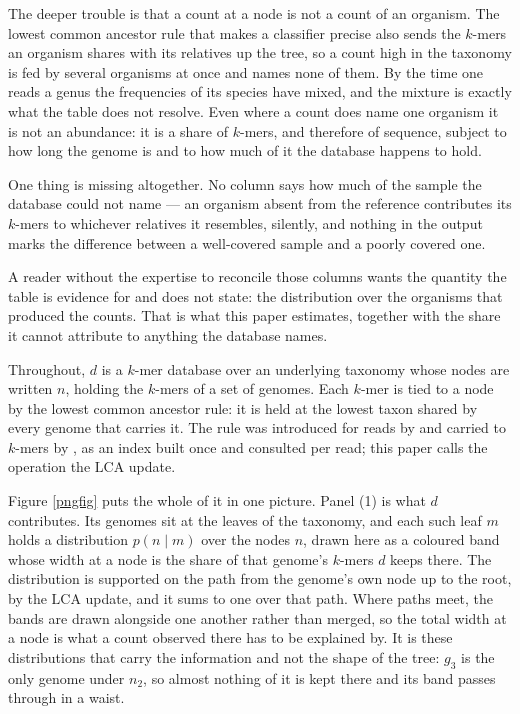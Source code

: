 \documentclass[pdflatex,sn-vancouver-num]{sn-jnl}
\begin{document}
    The deeper trouble is that a count at a node is not a count of an organism. The lowest common
    ancestor rule that makes a classifier precise also sends the $k$-mers an organism shares with its
    relatives up the tree, so a count high in the taxonomy is fed by several organisms at once and
    names none of them. By the time one reads a genus the frequencies of its species have mixed, and
    the mixture is exactly what the table does not resolve. Even where a count does name one organism
    it is not an abundance: it is a share of $k$-mers, and therefore of sequence, subject to how long
    the genome is and to how much of it the database happens to hold.

    One thing is missing altogether. No column says how much of the sample the database could not
    name --- an organism absent from the reference contributes its $k$-mers to whichever relatives it
    resembles, silently, and nothing in the output marks the difference between a well-covered sample
    and a poorly covered one.

    A reader without the expertise to reconcile those columns wants the quantity the table is
    evidence for and does not state: the distribution over the organisms that produced the counts.
    That is what this paper estimates, together with the share it cannot attribute to anything the
    database names.

    Throughout, $d$ is a $k$-mer database over an underlying taxonomy whose nodes are written $n$,
    holding the $k$-mers of a set of genomes. Each $k$-mer is tied to a node by the lowest common
    ancestor rule: it is held at the lowest taxon shared by every genome that carries it. The rule
    was introduced for reads by \citet{megan} and carried to $k$-mers by \citet{kraken}, as an index
    built once and consulted per read; this paper calls the operation the $\mathrm{LCA}$ update.

    Figure \ref{pngfig} puts the whole of it in one picture. Panel (1) is what $d$ contributes. Its
    genomes sit at the leaves of the taxonomy, and each such leaf $m$ holds a distribution
    $p(n \mid m)$ over the nodes $n$, drawn here as a coloured band whose width at a node is the
    share of that genome's $k$-mers $d$ keeps there. The distribution is supported on the path from
    the genome's own node up to the root, by the $\mathrm{LCA}$ update, and it sums to one over that
    path. Where paths meet, the bands are drawn alongside
    one another rather than merged, so the total width at a node is what a count observed there has
    to be explained by. It is these distributions that carry the information and not the shape of the
    tree: $g_3$ is the only genome under $n_2$, so almost nothing of it is kept there and its band
    passes through in a waist.
\end{document}
